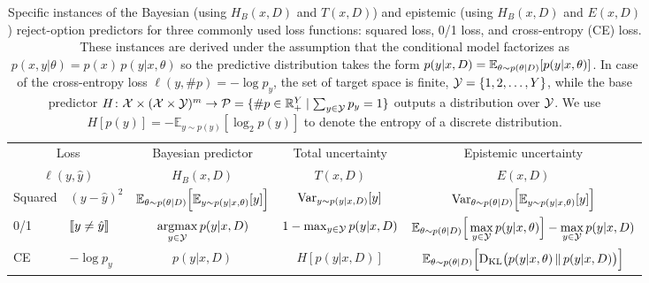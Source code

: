 \begin{table}[]
    \centering
    \begin{tabular}{ll|c|c|c}
          \multicolumn{2}{c|}{Loss}& Bayesian predictor & Total uncertainty & Epistemic uncertainty\\
          \multicolumn{2}{c|}{$\ell(y,\hat{y})$} & $H_B(x,D)$        & $T(x,D)$          & $E(x,D)$ \\
       \hline%
       \hline
       Squared & $(y-\hat{y})^2$ &
       ${\mathbb{E}}_{\theta\sim p(\theta|D)}\Big[{\mathbb{E}}_{y\sim p(y|x,\theta)}[y] \Big ]$  &
       ${\rm Var}_{y\sim p(y|x,D)} [y]$&
       ${\rm Var}_{\theta\sim p(\theta|D)} \Big [ {\mathbb{E}}_{y\sim p(y|x,\theta)}[y] \Big ]$\\
       \hline
       0/1 & $\leftbb y\neq \hat{y}\rightbb$ & 
       $\mathop{\rm argmax}\limits_{y\in{\cal Y}} p(y|x,D)$  &
       $1-\max_{y\in{\cal Y}} p(y|x,D)$ &
       ${\mathbb{E}}_{\theta\sim p(\theta|D)}\Big[ \max\limits_{y\in{\cal Y}} p(y|x,\theta)\Big ] - \max\limits_{y\in{\cal Y}} p(y|x,D)$ \\
       \hline
       CE & $-\log p_y$ & $p(y|x,D)$ & $H[p(y|x,D)]$ &
       ${\mathbb{E}}_{\theta\sim p(\theta|D)} \Big [{\rm D}_{\rm KL}\big (p(y|x,\theta)\, \|\, p(y|x,D)\big ) \Big ]$ \\       
    \end{tabular}
    \caption{Specific instances of the Bayesian (using $H_B(x,D)$ and $T(x,D)$) and epistemic (using $H_B(x,D)$ and $E(x,D)$) reject-option predictors for three commonly used loss functions: squared loss, 0/1 loss, and cross-entropy (CE) loss. These instances are derived under the assumption that the conditional model factorizes as $p(x,y|\theta)=p(x)\,p(y|x,\theta)$
    so the predictive distribution takes the form $p(y|x,D)={\mathbb{E}}_{\theta\sim p(\theta|D)}[p(y|x,\theta)]$.
    In case of the cross-entropy loss $\ell(y,\#p)=-\log p_y$, the set of target space is finite, ${\cal Y}=\{1,2,\ldots,Y\}$, while the base predictor $H\colon{\cal X}\times({\cal X}\times{\cal Y})^m\rightarrow{\cal P}=\{\#p\in\mathbb{R}_+^Y\mid \sum_{y\in{\cal Y}}p_y=1\}$ outputs a distribution over ${\cal Y}$. We use $H[p(y)] = -\mathbb{E}_{y \sim p(y)}[\log_2 p(y)]$ to denote the entropy of a discrete distribution.}
    \label{tab:Summary}
\end{table}
